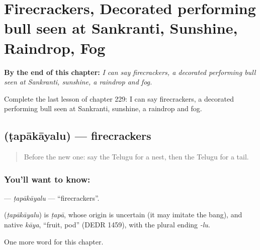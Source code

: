 
\chapter{Firecrackers, Decorated performing bull seen at Sankranti, Sunshine, Raindrop, Fog}
\label{ch:te-firecrackers-decorated-performing-bull-seen-at-sankranti-sunshine-raindrop-fog}

\begin{chapteropening}
\textbf{By the end of this chapter:} \emph{I can say firecrackers, a decorated performing bull seen at Sankranti, sunshine, a raindrop and fog.}

Complete the last lesson of chapter 229: I can say firecrackers, a decorated performing bull seen at Sankranti, sunshine, a raindrop and fog.
\end{chapteropening}

\section[\texorpdfstring{\te{టపాకాయలు} (ṭapākāyalu)}{టపాకాయలు (ṭapākāyalu)}]{ (ṭapākāyalu) — firecrackers}

\label{lesson:TE-C229-tapakayalu}



\begin{quote}
Before the new one: say the Telugu for a nest, then the Telugu for a tail.
\end{quote}

\subsection*{You'll want to know: }
\textbf{} — \emph{ṭapākāyalu} — \textquotedblleft{}firecrackers\textquotedblright{}.

\begin{cousinweb}
\textbf{} (\emph{ṭapākāyalu}) is \emph{ṭapā}, whose origin is uncertain (it may imitate the bang), and native \emph{kāya}, \textquotedblleft{}fruit, pod\textquotedblright{} (DEDR 1459), with the plural ending \emph{-lu}.
\end{cousinweb}

\begin{grammarlens}[title={What you've built}]
One more word for this chapter.
\end{grammarlens}

